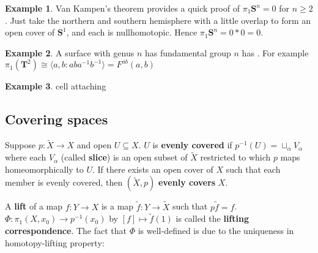 \documentclass[11pt]{article}
\theoremstyle{definition}
\newtheorem*{example}{Example}
\theoremstyle{plain}
\theoremstyle{remark}
\begin{document}
\begin{example}
Van Kampen's theorem provides a quick proof of $\pi_1\mathbf{S}^n=0$ for $n\geq2$. Just take the northern and southern hemisphere with a little overlap to form an open cover of $\mathbf{S}^1$, and each is nullhomotopic. Hence $\pi_1\mathbf{S}^n=0\ast0=0$.
\end{example}

\begin{example}
A surface with genus $n$ has fundamental group $n$ has . For example $\pi_1(\mathbf{T}^2)\cong\langle a,b:aba^{-1}b^{-1}\rangle=F^{ab}(a,b)$
\end{example}

\begin{example}
cell attaching
\end{example}

\subsection{Covering spaces}\label{8}

Suppose $p:\widetilde{X}\to X$ and open $U\subseteq X$. $U$ is \textbf{evenly covered} if $p^{-1}(U)=\sqcup_\alpha V_\alpha$ where each $V_\alpha$ (called \textbf{slice}) is an open subset of $\widetilde{X}$ restricted to which $p$ maps homeomorphically to $U$. If there exists an open cover of $X$ such that each member is evenly covered, then $(\widetilde{X},p)$ \textbf{evenly covers} $X$.\medbreak

A \textbf{lift} of a map $f:Y\to X$ is a map $\widetilde{f}:Y\to\widetilde{X}$ such that $p\widetilde{f}=f$. $\Phi:\pi_1(X,x_0)\to p^{-1}(x_0)$ by $[f]\mapsto\widetilde{f}(1)$ is called the \textbf{lifting correspondence}. The fact that $\Phi$ is well-defined is due to the uniqueness in homotopy-lifting property:
\end{document}
